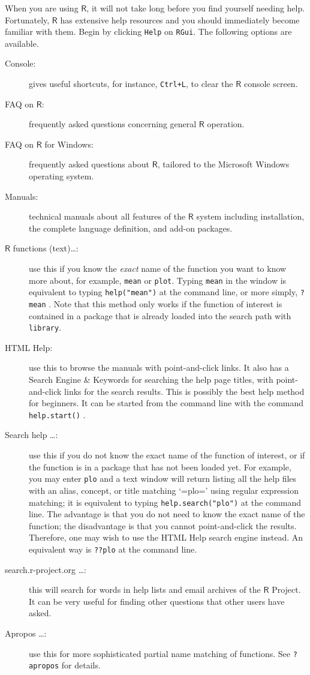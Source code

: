 When you are using \(\mathsf{R}\), it will not take long before you
find yourself needing help. Fortunately, \(\mathsf{R}\) has extensive
help resources and you should immediately become familiar with
them. Begin by clicking \texttt{Help} on \texttt{RGui}. The following options are
available.
\begin{description}
\item[{Console:}] gives useful shortcuts, for instance, \texttt{Ctrl+L}, to clear
the \(\mathsf{R}\) console screen.
\item[{FAQ on \(\mathsf{R}\):}] frequently asked questions concerning
general \(\mathsf{R}\) operation.
\item[{FAQ on \(\mathsf{R}\) for Windows:}] frequently asked questions
about \(\mathsf{R}\), tailored to the Microsoft Windows operating
system.
\item[{Manuals:}] technical manuals about all features of the
\(\mathsf{R}\) system including installation, the
complete language definition, and add-on packages.
\item[{\(\mathsf{R}\) functions (text)\ldots{}:}] use this if you know the
\emph{exact} name of the function you want to know more about, for
example, \texttt{mean} or \texttt{plot}. Typing \texttt{mean} in the window is
equivalent to typing \texttt{help("mean")}
 at the command line, or more
simply, \texttt{?mean} . Note that this
method only works if the function of interest is contained in a
package that is already loaded into the search path with
\texttt{library}.
\item[{HTML Help:}] use this to browse the manuals with point-and-click
links. It also has a Search Engine \& Keywords for
searching the help page titles, with point-and-click
links for the search results. This is possibly the
best help method for beginners. It can be started from
the command line with the command
\texttt{help.start()} .
\item[{Search help \ldots{}:}] use this if you do not know the exact name of
the function of interest, or if the function is in a package that
has not been loaded yet. For example, you may enter \texttt{plo} and a
text window will return listing all the help files with an alias,
concept, or title matching `=plo=' using regular expression
matching; it is equivalent to typing
\texttt{help.search("plo")}  at
the command line. The advantage is that you do not need to know
the exact name of the function; the disadvantage is that you
cannot point-and-click the results. Therefore, one may wish to
use the HTML Help search engine instead. An equivalent way is
\texttt{??plo}  at the command line.
\item[{search.r-project.org \ldots{}:}] this will search for words in help
lists and email archives of the \(\mathsf{R}\) Project. It can be
very useful for finding other questions that other users have
asked.
\item[{Apropos \ldots{}:}] use this for more sophisticated partial name
matching of functions. See \texttt{?apropos}
 for details.
\end{description}

